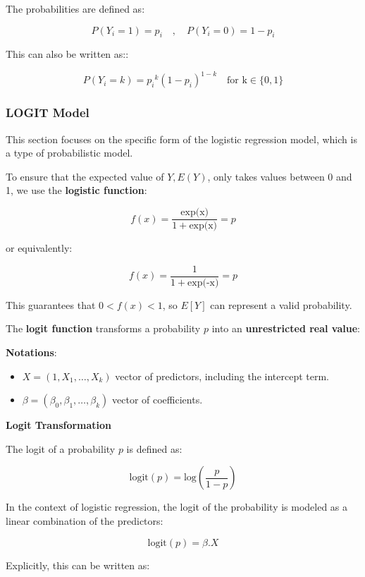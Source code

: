 \documentclass{article}
\providecommand{\tightlist}{%
  \setlength{\itemsep}{0pt}\setlength{\parskip}{0pt}}
\begin{document}
The probabilities are defined as:

\[P(Y_i=1) = p_i \quad, \quad P(Y_i = 0) = 1 - p_i\]

This can also be written as::

\[P(Y_i = k) = {p_i}^k(1 - p_i)^{1-k} \quad \text{for k} \in \{0, 1\}\]

\subsubsection{LOGIT Model}\label{logit-model}

This section focuses on the specific form of the logistic regression
model, which is a type of probabilistic model.

\medskip

To ensure that the expected value of \(Y, E(Y)\), only takes values
between 0 and 1, we use the \textbf{logistic function}:

\[f(x) = \dfrac{\text{exp(x)}}{1 + \text{exp(x)}} = p\]

or equivalently:

\[f(x) = \dfrac{1}{1 + \text{exp(-x)}} = p\]

\medskip

This guarantees that \(0 < f(x) < 1\), so \(E[Y]\) can represent a valid
probability.

The \textbf{logit function} transforms a probability \(p\) into an
\textbf{unrestricted real value}:

\textbf{Notations}:

\begin{itemize}
\tightlist
\item
  \(X = (1,X_1, \ldots, X_k)\) vector of predictors, including the
  intercept term.
\item
  \(\beta = (\beta_0,\beta_1, \ldots, \beta_k)\) vector of coefficients.
\end{itemize}

\medskip

\textbf{Logit Transformation}

The logit of a probability \(p\) is defined as:

\[\text{logit}(p) = \text{log}(\dfrac{p}{1 - p})\]

In the context of logistic regression, the logit of the probability is
modeled as a linear combination of the predictors:

\[\text{logit}(p) = \beta .X\]

Explicitly, this can be written as:
\end{document}
